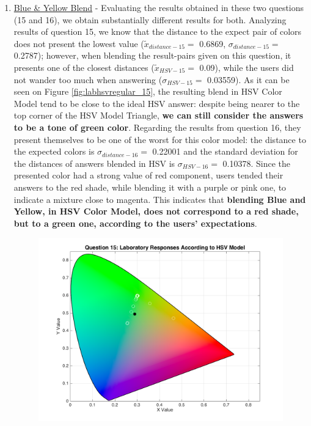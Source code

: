 \begin{enumerate}
\begin{figure}[htbp]
\begin{minipage}{0.48\textwidth}
      \label{fig:labhsvregular_11}
    \end{minipage}
  \end{figure}
  \item \ul{Blue \& Yellow Blend} - Evaluating the results obtained in these two questions (15 and 16), we obtain substantially different results for both. Analyzing results of question 15, we know that the distance to the expect pair of colors
  does not present the lowest value ($\tilde{x}_{distance-15} = $ 0.6869, $\sigma_{distance-15} = $ 0.2787); however, when blending the result-pairs given on this question, it presents one of the closest distances ($\tilde{x}_{HSV-15} = $ 0.09),
  while the users did not wander too much when answering ($\sigma_{HSV-15} = $ 0.03559). As it can be seen on Figure \ref{fig:labhsvregular_15}, the resulting blend in HSV Color Model tend to be close to the ideal HSV answer: despite being nearer
  to the top corner of the HSV Model Triangle, \textbf{we can still consider the answers to be a tone of green color}. Regarding the results from question 16, they present themselves to be one of the worst for this color model: the distance to the
  expected colors is $\sigma_{distance-16} = $ 0.22001 and the standard deviation for the distances of answers blended in HSV is $\sigma_{HSV-16} = $ 0.10378. Since the presented color had a strong value of red component, users tended their answers
  to the red shade, while blending it with a purple or pink one, to indicate a mixture close to magenta. This indicates that \textbf{blending Blue and Yellow, in HSV Color Model, does not correspond to a red shade, but to a green one, according to
  the users' expectations}.
  \begin{figure}[htbp]
    \centering
    \begin{minipage}{0.48\textwidth}
      \centering
      \includegraphics[width=\textwidth]{images/15_lab_HSVresponses.png}

\end{minipage}
\end{figure}
\end{enumerate}

